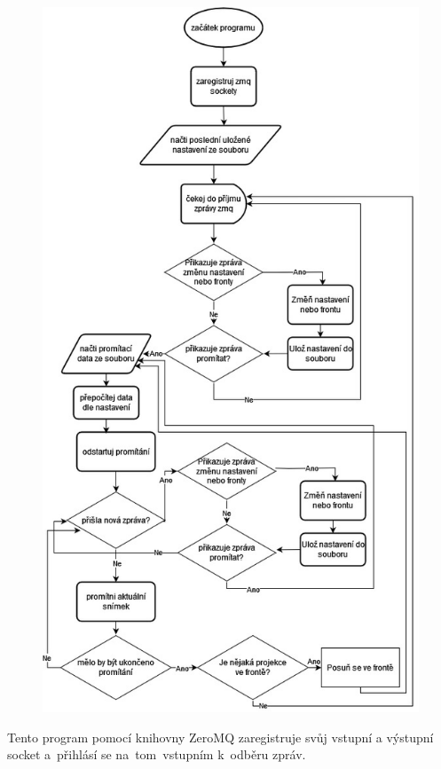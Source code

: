 \begin{figure}[H]
  \centering
  \includegraphics[width=\textwidth{}, trim=0 0 0 400, clip]{img/lasershow_flowchart.jpg}\clearpage
\end{figure}


\restoregeometry

Tento program pomocí knihovny ZeroMQ zaregistruje svůj vstupní a výstupní socket a~přihlásí se na~tom~vstupním k~odběru zpráv.

